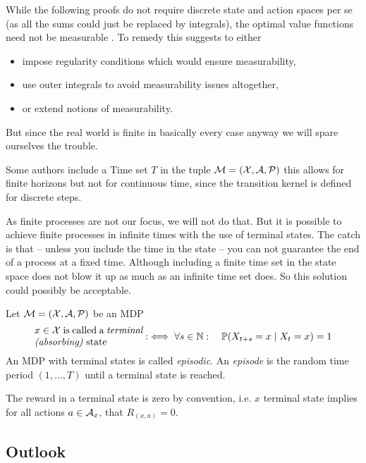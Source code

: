 \begin{remark}
	While the following proofs do not require discrete state and action spaces per se (as all the sums could just be replaced by integrals), the optimal value functions need not be measurable \parencite[157]{putermanMarkovDecisionProcesses2005}. To remedy this \citeauthor{putermanMarkovDecisionProcesses2005} suggests to either
	\begin{itemize}[noitemsep]
		\item impose regularity conditions which would ensure measurability,
		\item use outer integrals to avoid measurability issues altogether,
		\item or extend notions of measurability.
	\end{itemize}
	But since the real world is finite in basically every case anyway we will spare ourselves the trouble. 
\end{remark}

Some authors include a Time set \(T\) in the tuple \(\mathcal{M}=(\mathcal{X},\mathcal{A},\mathcal{P})\) \parencite[e.g.][]{putermanMarkovDecisionProcesses2005} this allows for finite horizons but not for continuous time, since the transition kernel is defined for discrete steps.


As finite processes are not our focus, we will not do that. But it is possible to achieve finite processes in infinite times with the use of terminal states. The catch is that -- unless you include the time in the state -- you can not guarantee the end of a process at a fixed time. Although including a finite time set in the state space does not blow it up as much as an infinite time set does. So this solution could possibly be acceptable.

\begin{definition}\label{def: episodic} Let \(\mathcal{M}=(\mathcal{X},\mathcal{A},\mathcal{P})\) be an MDP
	\[
		\parbox{11em}{\(x\in\cX \) is called a \emph{terminal (absorbing)} state} :\iff \forall s\in\N:\quad \Pr(X_{t+s}=x\mid X_t=x)=1
	\]
	An MDP with terminal states is called \emph{episodic}.
	An \emph{episode} is the random time period \((1,\dots,T)\) until a terminal state is reached.
\end{definition}
\begin{remark} The reward in a terminal state is zero by convention, i.e. \(x\) terminal state implies for all actions \(a\in\mathcal{A}_x\), that \(R_{(x,a)}=0\).
\end{remark}

\subsection{Outlook}

